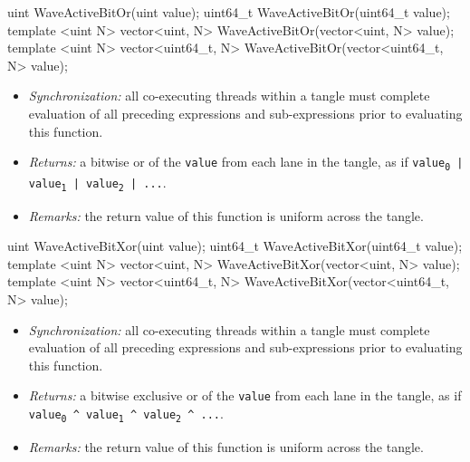 \begin{HLSL}
uint WaveActiveBitOr(uint value);
uint64_t WaveActiveBitOr(uint64_t value);
template <uint N> vector<uint, N> WaveActiveBitOr(vector<uint, N> value);
template <uint N> vector<uint64_t, N> WaveActiveBitOr(vector<uint64_t, N> value);
\end{HLSL}

\begin{itemize}
  \item \textit{Synchronization:} all co-executing threads within a \gls{tangle}
  must complete evaluation of all preceding expressions and sub-expressions
  prior to evaluating this function.
  \item \textit{Returns:} a bitwise or of the \texttt{value} from each
  \gls{lane} in the \gls{tangle}, as if \texttt{value\textsubscript{0} |
  value\textsubscript{1} | value\textsubscript{2} | ...}.
  \item \textit{Remarks:} the return value of this function is uniform across
  the \gls{tangle}.
\end{itemize}

\begin{HLSL}
uint WaveActiveBitXor(uint value);
uint64_t WaveActiveBitXor(uint64_t value);
template <uint N> vector<uint, N> WaveActiveBitXor(vector<uint, N> value);
template <uint N> vector<uint64_t, N> WaveActiveBitXor(vector<uint64_t, N> value);
\end{HLSL}

\begin{itemize}
  \item \textit{Synchronization:} all co-executing threads within a \gls{tangle}
  must complete evaluation of all preceding expressions and sub-expressions
  prior to evaluating this function.
  \item \textit{Returns:} a bitwise exclusive or of the \texttt{value} from each
  \gls{lane} in the \gls{tangle}, as if \texttt{value\textsubscript{0} \^{}
  value\textsubscript{1} \^{} value\textsubscript{2} \^{} ...}.
  \item \textit{Remarks:} the return value of this function is uniform across
  the \gls{tangle}.
\end{itemize}

